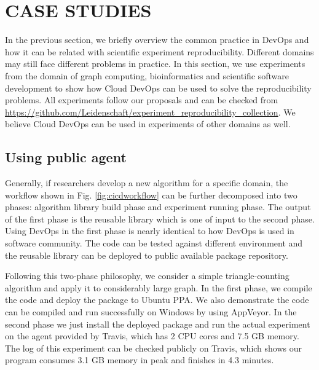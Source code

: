 \documentclass[10pt, conference, compsocconf]{IEEEtran}
\begin{document}
\section{CASE STUDIES}
In the previous section, we briefly overview the common practice in DevOps and how it can be related with scientific experiment reproducibility. Different domains may still face different problems in practice. In this section, we use experiments from the domain of graph computing, bioinformatics and scientific software development to show how Cloud DevOps can be used to solve the reproducibility problems. All experiments follow our proposals and can be checked from \url{https://github.com/Leidenschaft/experiment_reproducibility_collection}. We believe Cloud DevOps can be used in experiments of other domains as well. 

\subsection{Using public agent}
Generally, if researchers develop a new algorithm for a specific domain, the workflow shown in Fig. \ref{fig:cicdworkflow} can be further decomposed into two phases:
algorithm library build phase and experiment running phase. The output of the first phase is the reusable library which is one of input to the second phase. Using DevOps in the first phase is nearly identical to how DevOps is used in software community.  The code can be tested against different environment and 
the reusable library can be deployed to public available package repository.
 
Following this two-phase philosophy, we consider a simple triangle-counting algorithm and apply it to considerably large graph. %
In the first phase, we compile the code and deploy the package to Ubuntu PPA. We also demonstrate the code can be compiled and run successfully on Windows by using AppVeyor. In the second phase we just install the deployed package and run the actual experiment on the agent provided by Travis, which has 2 CPU cores and 7.5 GB memory. The log of this experiment can be checked publicly on Travis, which shows
our program consumes 3.1 GB memory in peak and finishes in 4.3 minutes. 
\end{document}
